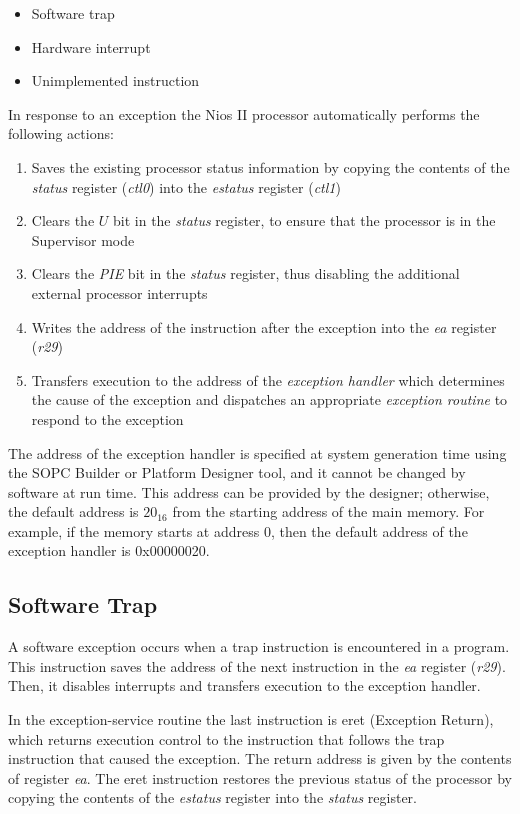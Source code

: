 \documentclass[11pt, twoside, pdftex]{article}
\begin{document}
\begin{itemize}
\item Software trap
\item Hardware interrupt
\item Unimplemented instruction
\end{itemize}
\noindent
In response to an exception the Nios II processor automatically performs the following actions:
\begin{enumerate}
\item Saves the existing processor status information by copying the contents
of the {\it status} register ({\it ctl0}) into the {\it estatus} register ({\it ctl1})

\item Clears the $U$ bit in the {\it status} register, to ensure that the processor
is in the Supervisor mode

\item Clears the {\it PIE} bit in the {\it status} register, thus disabling the
additional external processor interrupts

\item Writes the address of the instruction after the exception into the {\it ea}
register ({\it r29})

\item Transfers execution to the address of the {\it exception handler} which
determines the cause of the exception and dispatches an appropriate
{\it exception routine} to respond to the exception
\end{enumerate}
\noindent
The address of the exception handler is specified at system generation time
using the SOPC Builder or Platform Designer tool,
and it cannot be changed by software at run time. 
This address can be provided by the designer; otherwise, the default address is
$20_{16}$ from the starting address of the main memory. For example, if the 
memory starts at address 0, then the default address of the exception handler
is 0x00000020.

\subsection{Software Trap}

A software exception occurs when a {\sf trap} instruction is encountered in 
a program. This instruction saves the address of the next instruction in the
{\it ea} register ({\it r29}). Then, it disables interrupts and transfers
execution to the exception handler.

In the exception-service routine the last instruction is {\sf eret} (Exception Return), 
which returns execution control to the instruction that follows the {\sf trap} 
instruction that caused the exception. The return address is given by the contents
of register {\it ea}. The {\sf eret} instruction restores the
previous status of the processor by copying the contents of the {\it estatus}
register into the {\it status} register. 
\end{document}
